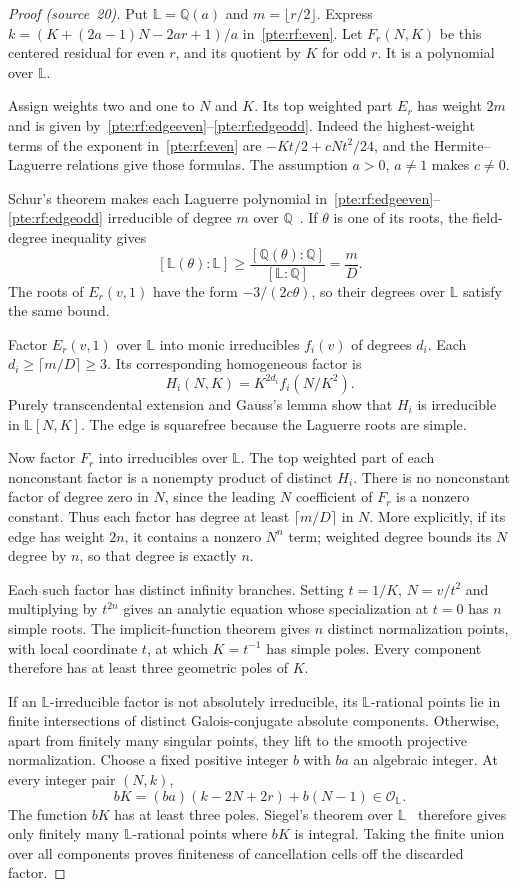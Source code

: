 \documentclass[11pt,a4paper]{article}
\numberwithin{equation}{section}
\theoremstyle{definition}
\theoremstyle{plain}
\newcommand{\src}[1]{\texorpdfstring{\textup{(source~#1)}}{(source #1)}}
\begin{document}
\begin{proof}[Proof \src{20}]
Put $\mathbb L=\mathbb Q(a)$ and $m=\lfloor r/2\rfloor$. Express $k=(K+(2a-1)N-2ar+1)/a$ in~\eqref{pte:rf:even}. Let $F_r(N,K)$ be this centered residual for even $r$, and its quotient by $K$ for odd $r$. It is a polynomial over $\mathbb L$.

Assign weights two and one to $N$ and $K$. Its top weighted part $E_r$ has weight $2m$ and is given by~\eqref{pte:rf:edgeeven}--\eqref{pte:rf:edgeodd}. Indeed the highest-weight terms of the exponent in~\eqref{pte:rf:even} are $-Kt/2+cNt^2/24$, and the Hermite--Laguerre relations give those formulas. The assumption $a>0$, $a\ne1$ makes $c\ne0$.

Schur's theorem makes each Laguerre polynomial in~\eqref{pte:rf:edgeeven}--\eqref{pte:rf:edgeodd} irreducible of degree $m$ over $\mathbb Q$~\cite{pte-schur}. If $\theta$ is one of its roots, the field-degree inequality gives
\[
 [\mathbb L(\theta):\mathbb L]\ge\frac{[\mathbb Q(\theta):\mathbb Q]}{[\mathbb L:\mathbb Q]}
 =\frac mD.
\]
The roots of $E_r(v,1)$ have the form $-3/(2c\theta)$, so their degrees over $\mathbb L$ satisfy the same bound.

Factor $E_r(v,1)$ over $\mathbb L$ into monic irreducibles $f_i(v)$ of degrees $d_i$. Each $d_i\ge\lceil m/D\rceil\ge3$. Its corresponding homogeneous factor is
\[
 H_i(N,K)=K^{2d_i}f_i(N/K^2).
\]
Purely transcendental extension and Gauss's lemma show that $H_i$ is irreducible in $\mathbb L[N,K]$. The edge is squarefree because the Laguerre roots are simple.

Now factor $F_r$ into irreducibles over $\mathbb L$. The top weighted part of each nonconstant factor is a nonempty product of distinct $H_i$. There is no nonconstant factor of degree zero in $N$, since the leading $N$ coefficient of $F_r$ is a nonzero constant. Thus each factor has degree at least $\lceil m/D\rceil$ in $N$. More explicitly, if its edge has weight $2n$, it contains a nonzero $N^n$ term; weighted degree bounds its $N$ degree by $n$, so that degree is exactly $n$.

Each such factor has distinct infinity branches. Setting $t=1/K$, $N=v/t^2$ and multiplying by $t^{2n}$ gives an analytic equation whose specialization at $t=0$ has $n$ simple roots. The implicit-function theorem gives $n$ distinct normalization points, with local coordinate $t$, at which $K=t^{-1}$ has simple poles. Every component therefore has at least three geometric poles of $K$.

If an $\mathbb L$-irreducible factor is not absolutely irreducible, its $\mathbb L$-rational points lie in finite intersections of distinct Galois-conjugate absolute components. Otherwise, apart from finitely many singular points, they lift to the smooth projective normalization. Choose a fixed positive integer $b$ with $ba$ an algebraic integer. At every integer pair $(N,k)$,
\[
 bK=(ba)(k-2N+2r)+b(N-1)\in\mathcal O_{\mathbb L}.
\]
The function $bK$ has at least three poles. Siegel's theorem over $\mathbb L$~\cite[Theorem 1.1]{pte-levin} therefore gives only finitely many $\mathbb L$-rational points where $bK$ is integral. Taking the finite union over all components proves finiteness of cancellation cells off the discarded factor.


\end{proof}
\end{document}
